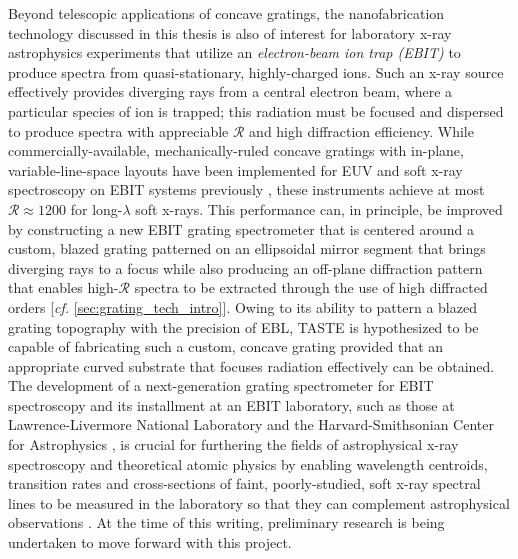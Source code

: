 Beyond telescopic applications of concave gratings, the nanofabrication technology discussed in this thesis is also of interest for laboratory x-ray astrophysics experiments \cite{Beiersdorfer03,Hell20} that utilize an \emph{electron-beam ion trap (EBIT)} \cite{Levine88a,Levine88b} to produce spectra from quasi-stationary, highly-charged ions. 
Such an x-ray source effectively provides diverging rays from a central electron beam, where a particular species of ion is trapped; this radiation must be focused and dispersed to produce spectra with appreciable $\mathscr{R}$ and high diffraction efficiency. %
While commercially-available, mechanically-ruled concave gratings with in-plane, variable-line-space layouts have been implemented for EUV and soft x-ray spectroscopy on EBIT systems previously \cite{Beiersdorfer99,Utter99,Beiersdorfer04,Ohashi11,Shi14}, these instruments achieve at most $\mathscr{R} \approx 1200$ for long-$\lambda$ soft x-rays. 
This performance can, in principle, be improved by constructing a new EBIT grating spectrometer that is centered around a custom, blazed grating patterned on an ellipsoidal mirror segment that brings diverging rays to a focus while also producing an off-plane diffraction pattern that enables high-$\mathscr{R}$ spectra to be extracted through the use of high diffracted orders [\emph{cf.\@} \cref{sec:grating_tech_intro}]. 
Owing to its ability to pattern a blazed grating topography with the precision of EBL, TASTE is hypothesized to be capable of fabricating such a custom, concave grating provided that an appropriate curved substrate that focuses radiation effectively can be obtained. 
The development of a next-generation grating spectrometer for EBIT spectroscopy and its installment at an EBIT laboratory, such as those at Lawrence-Livermore National Laboratory \cite{llnl_ebit} and the Harvard-Smithsonian Center for Astrophysics \cite{cfa_ebit}, is crucial for furthering the fields of astrophysical x-ray spectroscopy and theoretical atomic physics by enabling wavelength centroids, transition rates and cross-sections of faint, poorly-studied, soft x-ray spectral lines to be measured in the laboratory so that they can complement astrophysical observations \cite{Smith19_labastro}. 
At the time of this writing, preliminary research is being undertaken to move forward with this project. 




